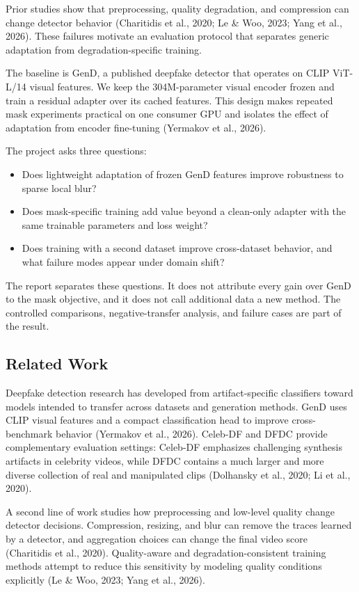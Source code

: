 \documentclass[10pt,twocolumn]{article}
\begin{document}
Prior studies show that preprocessing, quality degradation, and compression can
change detector behavior (Charitidis et al., 2020; Le \& Woo, 2023; Yang et
al., 2026). These failures
motivate an evaluation protocol that separates generic adaptation from
degradation-specific training.

The baseline is GenD, a published deepfake detector that operates on CLIP
ViT-L/14 visual features. We keep the 304M-parameter visual encoder frozen and
train a residual adapter over its cached features. This design makes repeated
mask experiments practical on one consumer GPU and isolates the effect of
adaptation from encoder fine-tuning (Yermakov et al., 2026).

The project asks three questions:
\begin{itemize}
  \item Does lightweight adaptation of frozen GenD features improve robustness
  to sparse local blur?
  \item Does mask-specific training add value beyond a clean-only adapter with
  the same trainable parameters and loss weight?
  \item Does training with a second dataset improve cross-dataset behavior, and
  what failure modes appear under domain shift?
\end{itemize}

The report separates these questions. It does not attribute every gain over
GenD to the mask objective, and it does not call additional data a new method.
The controlled comparisons, negative-transfer analysis, and failure cases are
part of the result.

\subsection{Related Work}

Deepfake detection research has developed from artifact-specific classifiers
toward models intended to transfer across datasets and generation methods.
GenD uses CLIP visual features and a compact classification head to improve
cross-benchmark behavior (Yermakov et al., 2026). Celeb-DF and DFDC provide
complementary evaluation settings: Celeb-DF emphasizes challenging synthesis
artifacts in celebrity videos, while DFDC contains a much larger and more
diverse collection of real and manipulated clips (Dolhansky et al., 2020; Li et
al., 2020).

A second line of work studies how preprocessing and low-level quality change
detector decisions. Compression, resizing, and blur can remove the traces
learned by a detector, and aggregation choices can change the final video score
(Charitidis et al., 2020). Quality-aware and degradation-consistent training
methods attempt to reduce this sensitivity by modeling quality conditions
explicitly (Le \& Woo, 2023; Yang et al., 2026).
\end{document}
